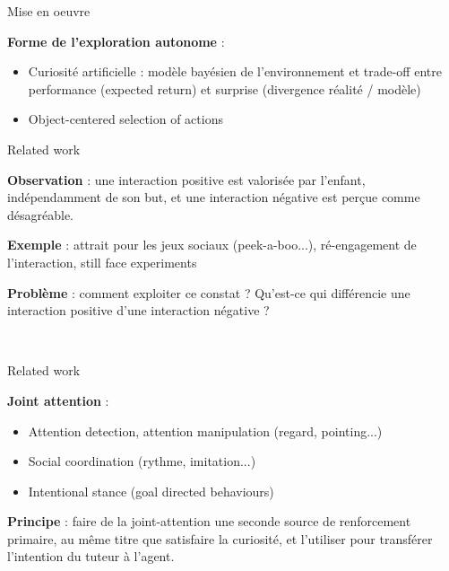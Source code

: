 \documentclass[xcolor=pst,dvips,12pt,english,french]{beamer}
\begin{document}
	\begin{frame}{Mise en oeuvre}
		\begin{block}{}
			\textbf{Forme de l'exploration autonome} : 
			\begin{itemize}
				\item Curiosité artificielle : modèle bayésien de l'environnement et trade-off entre performance (expected return) et surprise (divergence réalité / modèle)
				\item Object-centered selection of actions
			\end{itemize}
		\end{block}
	\end{frame}
	
	\begin{frame}{Related work}
		\begin{block}{}
			\textbf{Observation} : une interaction positive est valorisée par l'enfant, indépendamment de son but, et une interaction négative est perçue comme désagréable.
		\end{block}
		\begin{exampleblock}{}
			\textbf{Exemple} : attrait pour les jeux sociaux (peek-a-boo...), ré-engagement de l'interaction, still face experiments
		\end{exampleblock}
		\begin{alertblock}{}
			\textbf{Problème} : comment exploiter ce constat ? Qu'est-ce qui différencie une interaction positive d'une interaction négative ?
		\end{alertblock}
		\vfill
		\tiny
		\\
	\end{frame}
	
	\begin{frame}{Related work}
		\begin{block}{}
			\textbf{Joint attention} :
			\begin{itemize}
				\item Attention detection, attention manipulation (regard, pointing...)
				\item Social coordination (rythme, imitation...)
				\item Intentional stance (goal directed behaviours)
			\end{itemize}
		\end{block}
		\begin{exampleblock}{}
			\textbf{Principe} : faire de la joint-attention une seconde source de renforcement primaire, au même titre que satisfaire la curiosité, et l'utiliser pour transférer l'intention du tuteur à l'agent.
		\end{exampleblock}	
		\vfill
		\tiny
	\end{frame}
	
\end{document}
